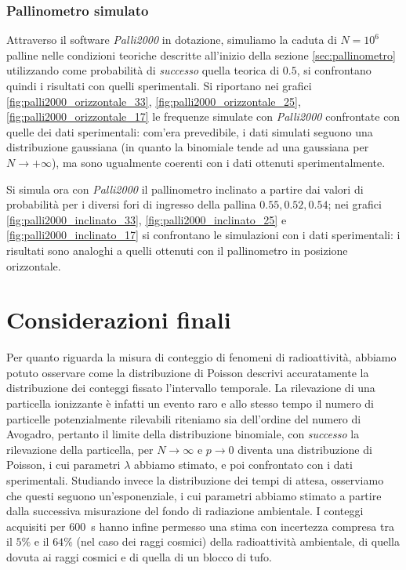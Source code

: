 \documentclass[10pt,oneside,a4paper]{article}
\begin{document}
\subsubsection{Pallinometro simulato}
Attraverso il software \emph{Palli2000} in dotazione, simuliamo la caduta di $N = 10^6$ palline nelle condizioni teoriche descritte all'inizio della sezione \ref{sec:pallinometro} utilizzando come probabilità di \emph{successo} quella teorica di $0.5$, si confrontano quindi i risultati con quelli sperimentali. Si riportano nei grafici \ref{fig:palli2000_orizzontale_33}, \ref{fig:palli2000_orizzontale_25}, \ref{fig:palli2000_orizzontale_17} le frequenze simulate con \emph{Palli2000} confrontate con quelle dei dati sperimentali: com'era prevedibile, i dati simulati seguono una distribuzione gaussiana (in quanto la binomiale tende ad una gaussiana per $N \rightarrow + \infty$), ma sono ugualmente coerenti con i dati ottenuti sperimentalmente.

Si simula ora con \emph{Palli2000} il pallinometro inclinato a partire dai valori di probabilità per i diversi fori di ingresso della pallina $0.55, 0.52, 0.54$; nei grafici \ref{fig:palli2000_inclinato_33}, \ref{fig:palli2000_inclinato_25} e \ref{fig:palli2000_inclinato_17} si confrontano le simulazioni con i dati sperimentali: i risultati sono analoghi a quelli ottenuti con il pallinometro in posizione orizzontale.

\section{Considerazioni finali}
Per quanto riguarda la misura di conteggio di fenomeni di radioattività, abbiamo potuto osservare come la distribuzione di Poisson descrivi accuratamente la distribuzione dei conteggi fissato l'intervallo temporale. La rilevazione di una particella ionizzante è infatti un evento raro e allo stesso tempo il numero di particelle potenzialmente rilevabili riteniamo sia dell'ordine del numero di Avogadro, pertanto il limite della distribuzione binomiale, con \emph{successo} la rilevazione della particella, per $N \rightarrow \infty$ e $p \rightarrow 0$ diventa una distribuzione di Poisson, i cui parametri $\lambda$ abbiamo stimato, e poi confrontato con i dati sperimentali. Studiando invece la distribuzione dei tempi di attesa, osserviamo che questi seguono un'esponenziale, i cui parametri abbiamo stimato a partire dalla successiva misurazione del fondo di radiazione ambientale. I conteggi acquisiti per \SI{600}{s} hanno infine permesso una stima con incertezza compresa tra il $5\%$ e il $64\%$ (nel caso dei raggi cosmici) della radioattività ambientale, di quella dovuta ai raggi cosmici e di quella di un blocco di tufo.
\end{document}
